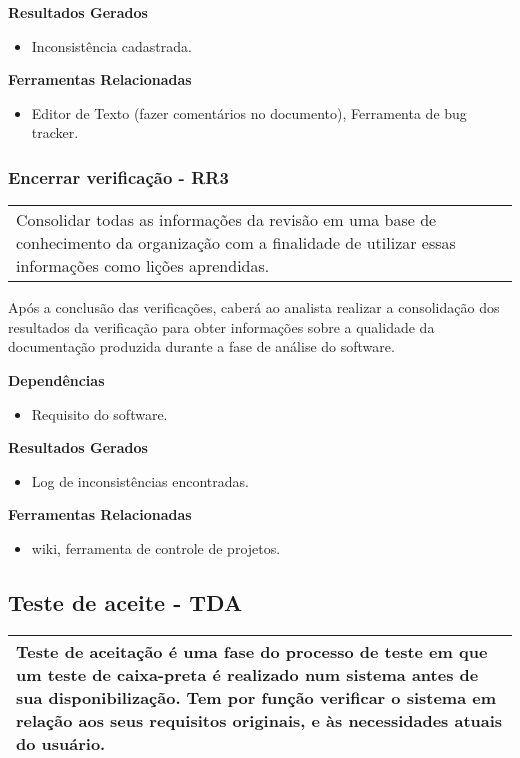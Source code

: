 \textbf{Resultados Gerados}
\begin{itemize}
    \item Inconsistência cadastrada.
\end{itemize}

\textbf{Ferramentas Relacionadas}
\begin{itemize}
    \item  Editor de Texto (fazer comentários no documento), Ferramenta de bug tracker.
\end{itemize}

\subsubsection{Encerrar verificação - RR3}
\label{sec:rr3}

\begin{table}[!ht]
\centering
\begin{tabular}{|p{130mm}|}
\hline
Consolidar todas as informações da revisão em uma base de conhecimento da organização com a finalidade de utilizar essas informações como lições aprendidas.
\hline
\end{tabular}
\end{table}

Após a conclusão das verificações, caberá ao analista realizar a consolidação dos resultados da verificação para obter informações sobre a qualidade da documentação produzida durante a fase de análise do software.

\textbf{Dependências}
\begin{itemize}
    \item Requisito do software.
\end{itemize}

\textbf{Resultados Gerados}
\begin{itemize}
    \item Log de inconsistências encontradas.
\end{itemize}

\textbf{Ferramentas Relacionadas}
\begin{itemize}
    \item  wiki, ferramenta de controle de projetos.
\end{itemize}

\subsection{Teste de aceite - TDA}
\label{sec:tda}

\begin{table}[!ht]
\centering
\begin{tabular}{|p{130mm}|}
\hline
Teste de aceitação é uma fase do processo de teste em que um teste de caixa-preta é realizado num sistema antes de sua disponibilização. Tem por função verificar o sistema em relação aos seus requisitos originais, e às necessidades atuais do usuário. \\ 
\hline
\end{tabular}
\end{table}

